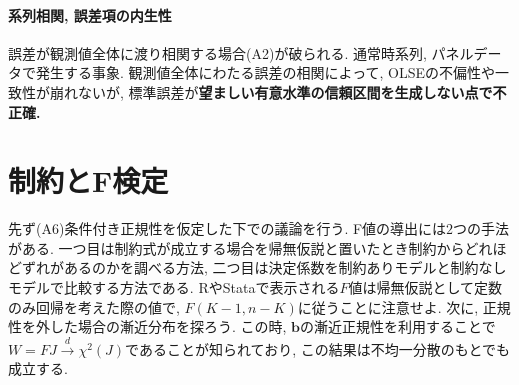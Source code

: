 \documentclass[paper=a4paper,fontsize=10pt]{jlreq}
\begin{document}
\paragraph{系列相関, 誤差項の内生性}
誤差が観測値全体に渡り相関する場合(A2)が破られる. 通常時系列, パネルデータで発生する事象. 観測値全体にわたる誤差の相関によって, OLSEの不偏性や一致性が崩れないが, 標準誤差が\rmfamily\mcfamily\bfseries{望ましい有意水準の信頼区間を生成しない}\mdseries 点で不正確.\\

\section{制約とF検定}
先ず(A6)条件付き正規性を仮定した下での議論を行う. F値の導出には$2$つの手法がある. 一つ目は制約式が成立する場合を帰無仮説と置いたとき制約からどれほどずれがあるのかを調べる方法, 二つ目は決定係数を制約ありモデルと制約なしモデルで比較する方法である. RやStataで表示される$F$値は帰無仮説として定数のみ回帰を考えた際の値で, $F(K-1, n-K)$に従うことに注意せよ. 次に, 正規性を外した場合の漸近分布を探ろう. この時, $\mathbf{b}$の漸近正規性を利用することで$W=F J\overset{d}{\to}\chi ^2(J)$であることが知られており, この結果は不均一分散のもとでも成立する.\\
\end{document}
